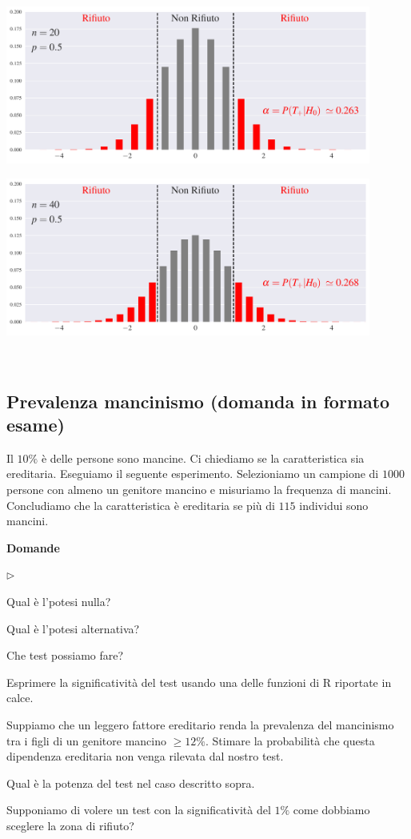 \documentclass[12pt,openany]{book}
\newcommand{\mylabel}[1]{{\footnotesize\textsf{#1}}\hfill}
\renewenvironment{itemize}
  {\begin{list}{$\triangleright$}{%
   \setlength{\parskip}{0mm}
   \setlength{\topsep}{.2\baselineskip}
   \setlength{\rightmargin}{0mm}
   \setlength{\listparindent}{0mm}
   \setlength{\itemindent}{0mm}
   \setlength{\labelwidth}{3ex}
   \setlength{\itemsep}{.4\baselineskip}
   \setlength{\parsep}{0mm}
   \setlength{\partopsep}{0mm}
   \setlength{\labelsep}{1ex}
   \setlength{\leftmargin}{\labelwidth+\labelsep}
   \let\makelabel\mylabel}}{%
   \end{list}\vspace*{-1.3mm}}
\theoremstyle{mio}
\theoremstyle{liscio}
\begin{document}
\hfil\includegraphics[width=0.9\textwidth]{figure/B-test-standard2_01.pdf}

\hfil\includegraphics[width=0.9\textwidth]{figure/B-test-standard2_02.pdf}



\hfill{}\clearpage\
\subsection{Prevalenza mancinismo (domanda in formato esame)}

Il $10\%$ è delle persone sono mancine. Ci chiediamo se la caratteristica sia ereditaria. Eseguiamo il seguente esperimento. Selezioniamo un campione di $1000$ persone con almeno un genitore mancino e misuriamo la frequenza di mancini. Concludiamo che la caratteristica \`e ereditaria se pi\`u di $115$ individui sono mancini.

\textbf{Domande}

\begin{itemize}
\item[1.] Qual è l'potesi nulla?

\item[2.] Qual è l'potesi alternativa?

\item[3.] Che test possiamo fare?

\item[4.] Esprimere la significatività del test usando una delle funzioni di R riportate in calce.

\item[5.] Suppiamo che un leggero fattore ereditario renda la prevalenza del mancinismo tra i figli di un genitore mancino $\ge12\%$. Stimare la probabilità che questa dipendenza ereditaria non venga rilevata dal nostro test. 

\item[6.] Qual è la potenza del test nel caso descritto sopra.

\item[7.] Supponiamo di volere un test con la significatività del $1\%$ come dobbiamo sceglere la zona di rifiuto?
\end{itemize}
\end{document}
